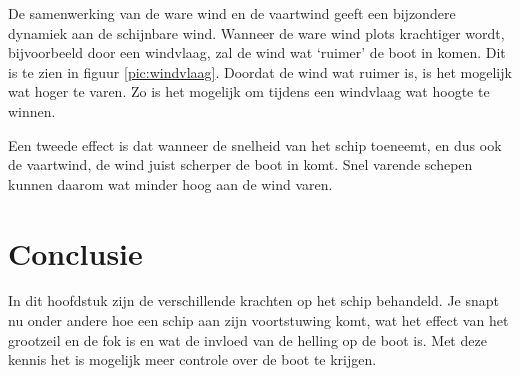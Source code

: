 De samenwerking van de ware wind en de vaartwind geeft een bijzondere dynamiek aan de schijnbare wind. Wanneer de ware wind plots krachtiger wordt, bijvoorbeeld door een windvlaag, zal de wind wat `ruimer' de boot in komen. Dit is te zien in figuur \ref{pic:windvlaag}. Doordat de wind wat ruimer is, is het mogelijk wat hoger te varen. Zo is het mogelijk om tijdens een windvlaag wat hoogte te winnen.

Een tweede effect is dat wanneer de snelheid van het schip toeneemt, en dus ook de vaartwind, de wind juist scherper de boot in komt. Snel varende schepen kunnen daarom wat minder hoog aan de wind varen.

\section{Conclusie}
In dit hoofdstuk zijn de verschillende krachten op het schip behandeld. Je snapt nu onder andere hoe een schip aan zijn voortstuwing komt, wat het effect van het grootzeil en de fok is en wat de invloed van de helling op de boot is. Met deze kennis het is mogelijk meer controle over de boot te krijgen.  